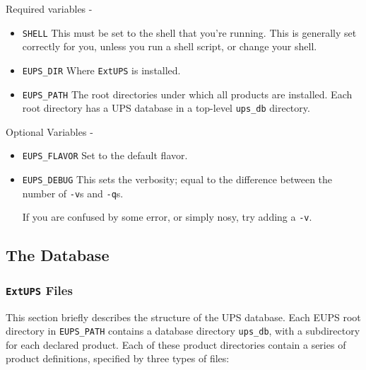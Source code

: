 \documentclass{article}
\newcommand{\code}[1]{\texttt{#1}}
\newcommand{\eups}{\code{ExtUPS}}
\begin{document}
Required variables -

\begin{itemize}
  \item \code{SHELL}
    This must be set to the shell that you're running. This is
    generally set correctly for you, unless you run a shell script, or
    change your shell.

  \item \code{EUPS\_DIR}
    Where \eups{} is installed.

  \item \code{EUPS\_PATH}
    The root directories under which all products are installed.
    Each root directory has a UPS database in a top-level \code{ups\_db} directory.
\end{itemize}

Optional Variables -

\begin{itemize}
  \item \code{EUPS\_FLAVOR}
    Set to the default flavor.

  \item \code{EUPS\_DEBUG}
    This sets the verbosity; equal to the difference between the number of \code{-v}s
    and \code{-q}s.

    If you are confused by some error, or simply nosy, try adding a \code{-v}.
\end{itemize}

\subsection{The Database}

\subsubsection{\eups{} Files}

This section briefly describes the structure of the UPS database. Each
EUPS root directory in \code{EUPS\_PATH} contains a database directory
\code{ups\_db}, with a subdirectory for each declared product.  Each
of these product directories contain a series of product definitions,
specified by three types of files:
\end{document}
